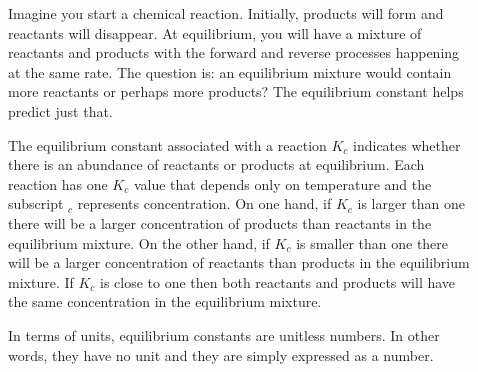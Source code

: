\documentclass[main.tex]{subfiles}
\begin{document}
\begin{description}
\item[] Imagine you start a chemical reaction. Initially, products will form and reactants will disappear. At equilibrium, you will have a mixture of reactants and products with the forward and reverse processes happening at the same rate. The question is: an equilibrium mixture would contain more reactants or perhaps more products? The equilibrium constant helps predict just that.
\item[] The equilibrium constant associated with a reaction $K_c$ indicates whether there is an abundance of reactants or products at equilibrium. Each reaction has one $K_c$ value that depends only on temperature and the subscript $_c$ represents concentration. On one hand, if $K_c$ is larger than one there will be a larger concentration of products than reactants in the equilibrium mixture. On the other hand, if  $K_c$ is smaller than one there will be a larger concentration of reactants than products in the equilibrium mixture. If  $K_c$ is close to one then both reactants and products will have the same concentration in the equilibrium mixture. 
 \begin{center}  \end{center}

In terms of units, equilibrium constants are unitless numbers. In other words, they have no unit and they are simply expressed as a number.




\end{description}
\end{document}
